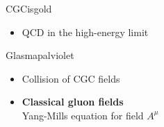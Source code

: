 \documentclass[aspectratio=169,11pt,usenames,dvipsnames]{beamer}
\begin{document}
\begin{frame}[noframenumbering]
\begin{columns}[onlytextwidth,t]
\begin{center}
                \begin{custombox2}{CGC}{isgold}
                \small
                \begin{varwidth}{0.76\textwidth}
                \begin{itemize}\itemsep0em 
                    \item QCD in the high-energy limit
                \end{itemize}
                \end{varwidth}
            \end{custombox2}
            \begin{custombox2}{Glasma}{palviolet}
                \small
                \begin{varwidth}{0.76\textwidth}
                \begin{itemize}\itemsep0em 
                    \item Collision of CGC fields
                    \item {\bfseries Classical gluon fields}\\[1pt]
                        {\color{lightgray}\scriptsize Yang-Mills equation for field $A^\mu$}
                    

\end{itemize}
\end{varwidth}
\end{custombox2}
\end{center}
\end{columns}
\end{frame}
\end{document}
